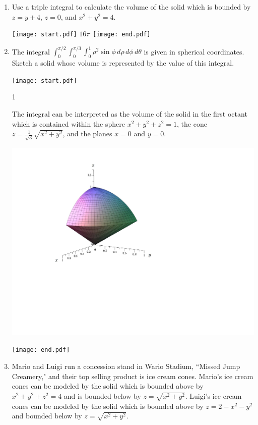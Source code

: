 \documentclass[12pt]{article}
\begin{document}
\begin{enumerate}
\item Use a triple integral to calculate the volume of the solid which is bounded by $z=y+4$, $z=0$, and $x^2+y^2=4$.

\texttt{[image: start.pdf]}
{{$16\pi$}}
\texttt{[image: end.pdf]}


\item The integral $\int_0^{\pi/2} \int_0^{\pi/3} \int_0^1 \rho^2\sin{\phi} \,d\rho\,d\phi\,d\theta$ is given in spherical coordinates.  Sketch a solid whose volume is represented by the value of this integral.

\texttt{[image: start.pdf]}
{{{1\linewidth}{The integral can be interpreted as the volume of the solid in the first octant which is contained within the sphere $x^2+y^2+z^2=1$, the cone $z=\frac{1}{\sqrt{3}}\sqrt{x^2+y^2}$, and the planes $x=0$ and $y=0$.
\begin{center}
\includegraphics[scale=0.33]{volume3.pdf}
\end{center}
}}}
\texttt{[image: end.pdf]}


\item Mario and Luigi run a concession stand in Wario Stadium, ``Missed Jump Creamery," and their top selling product is ice cream cones.  Mario's ice cream cones can be modeled by the solid which is bounded above by $x^2+y^2+z^2=4$ and is bounded below by $z=\sqrt{x^2+y^2}$.  Luigi's ice cream cones can be modeled by the solid which is bounded above by $z=2-x^2-y^2$ and bounded below by $z=\sqrt{x^2+y^2}$. 


\end{enumerate}
\end{document}

